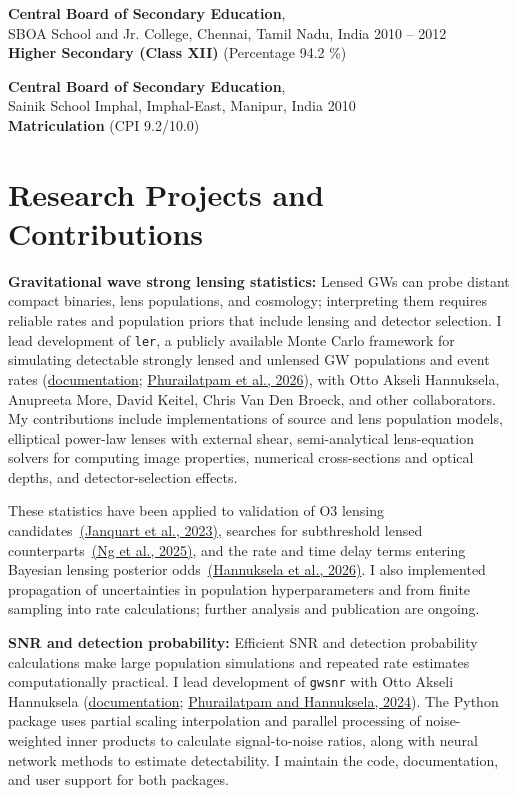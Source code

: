 \documentclass[margin,line]{res}
\begin{document}
\begin{resume}
{\bf Central Board of Secondary Education},\\ SBOA School and Jr. College, Chennai, Tamil Nadu, India \hfill 2010 -- 2012 \\
{\bf Higher Secondary (Class XII)} \hfill (Percentage 94.2 \%)

{\bf Central Board of Secondary Education},\\ Sainik School Imphal, Imphal-East, Manipur, India \hfill 2010 \\
{\bf Matriculation} \hfill (CPI 9.2/10.0)

\vspace{.2in}
\section{\sc Research Projects and Contributions}

{\bf Gravitational wave strong lensing statistics:}
Lensed GWs can probe distant compact binaries, lens populations, and cosmology; interpreting them requires reliable rates and population priors that include lensing and detector selection. I lead development of \texttt{ler}, a publicly available Monte Carlo framework for simulating detectable strongly lensed and unlensed GW populations and event rates (\href{https://ler.hemantaph.com/}{documentation}; \href{https://arxiv.org/abs/2407.07526}{Phurailatpam et al., 2026}), with Otto Akseli Hannuksela, Anupreeta More, David Keitel, Chris Van Den Broeck, and other collaborators. My contributions include implementations of source and lens population models, elliptical power-law lenses with external shear, semi-analytical lens-equation solvers for computing image properties, numerical cross-sections and optical depths, and detector-selection effects.

These statistics have been applied to validation of O3 lensing candidates~\href{https://arxiv.org/abs/2306.03827}{(Janquart et al., 2023)}, searches for subthreshold lensed counterparts~\href{https://arxiv.org/abs/2403.16532}{(Ng et al., 2025)}, and the rate and time delay terms entering Bayesian lensing posterior odds~\href{https://arxiv.org/abs/2510.15463}{(Hannuksela et al., 2026)}. I also implemented propagation of uncertainties in population hyperparameters and from finite sampling into rate calculations; further analysis and publication are ongoing.

\textbf{SNR and detection probability:} Efficient SNR and detection probability calculations make large population simulations and repeated rate estimates computationally practical. I lead development of \texttt{gwsnr} with Otto Akseli Hannuksela (\href{https://gwsnr.hemantaph.com/}{documentation}; \href{https://arxiv.org/abs/2412.09888}{Phurailatpam and Hannuksela, 2024}). The Python package uses partial scaling interpolation and parallel processing of noise-weighted inner products to calculate signal-to-noise ratios, along with neural network methods to estimate detectability. I maintain the code, documentation, and user support for both packages.


\end{resume}
\end{document}
